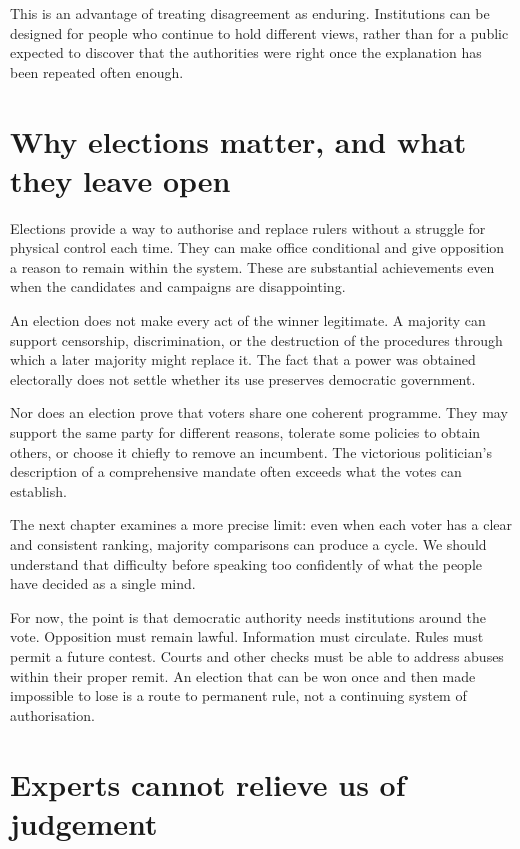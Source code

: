 \documentclass[12pt,a4paper]{book}
\begin{document}
This is an advantage of treating disagreement as enduring. Institutions can be designed for people who continue to hold different views, rather than for a public expected to discover that the authorities were right once the explanation has been repeated often enough.

\section*{Why elections matter, and what they leave open}

Elections provide a way to authorise and replace rulers without a struggle for physical control each time. They can make office conditional and give opposition a reason to remain within the system. These are substantial achievements even when the candidates and campaigns are disappointing.

An election does not make every act of the winner legitimate. A majority can support censorship, discrimination, or the destruction of the procedures through which a later majority might replace it. The fact that a power was obtained electorally does not settle whether its use preserves democratic government.

Nor does an election prove that voters share one coherent programme. They may support the same party for different reasons, tolerate some policies to obtain others, or choose it chiefly to remove an incumbent. The victorious politician's description of a comprehensive mandate often exceeds what the votes can establish.

The next chapter examines a more precise limit: even when each voter has a clear and consistent ranking, majority comparisons can produce a cycle. We should understand that difficulty before speaking too confidently of what the people have decided as a single mind.

For now, the point is that democratic authority needs institutions around the vote. Opposition must remain lawful. Information must circulate. Rules must permit a future contest. Courts and other checks must be able to address abuses within their proper remit. An election that can be won once and then made impossible to lose is a route to permanent rule, not a continuing system of authorisation.

\section*{Experts cannot relieve us of judgement}
\end{document}
